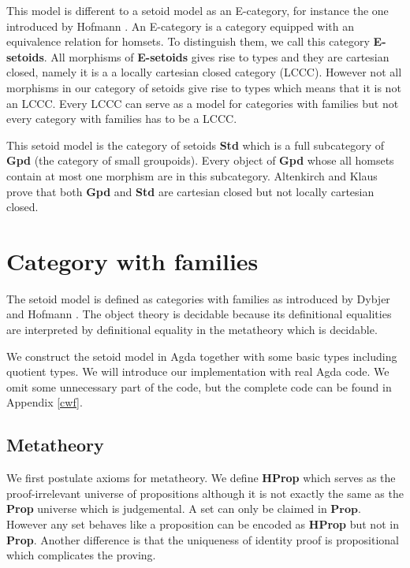 \begin{remark}
This model is different to a setoid model as an E-category, for instance
the one introduced by Hofmann \cite{hofmann1995interpretation}. An E-category is a category equipped with
an equivalence relation for homsets. To distinguish them, we call this
category \textbf{E-setoids}.  All morphisms of \textbf{E-setoids}
gives rise to types and they are cartesian closed, namely it is a a locally
cartesian closed category (LCCC). However not all morphisms in our category of setoids give rise to types which means that it is not an LCCC. Every LCCC can serve as a model for categories with
families but not every category with families has to be a LCCC. 

This setoid model is the category of setoids \textbf{Std} which is a full subcategory of \textbf{Gpd} (the category of small groupoids). Every object of \textbf{Gpd} whose all homsets contain at most one morphism are in this subcategory. Altenkirch and Klaus \cite{Altenkirch12setoidsare} prove that both \textbf{Gpd} and \textbf{Std} are cartesian closed but not locally cartesian closed.
\end{remark}


\section{Category with families}


The setoid model is defined as categories with families as introduced by Dybjer \cite{Dyb:96} and Hofmann
\cite{hof:97}. The object theory is decidable because its definitional equalities are interpreted by definitional equality in the metatheory which is decidable.

We construct the setoid model in Agda together with some basic types including quotient types. We will introduce our implementation with real Agda code. We omit some unnecessary part of the code, but the complete code can be found in Appendix \ref{cwf}.


\subsection{Metatheory}

We first postulate axioms for metatheory. We define \textbf{HProp} which serves as the proof-irrelevant universe of propositions although it is not exactly the same as the \textbf{Prop} universe which is judgemental. A set can only be claimed in $\textbf{Prop}$. However any set behaves like a proposition can be encoded as \textbf{HProp} but not in \textbf{Prop}. Another difference is that the uniqueness of identity proof is propositional which complicates the proving.

